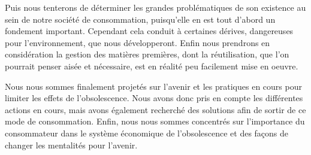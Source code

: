 \smallbreak Puis nous tenterons de déterminer les grandes problématiques de son existence au sein de notre société de consommation, puisqu'elle en est tout d'abord un fondement important. Cependant cela conduit à certaines dérives, dangereuses pour l'environnement, que nous développeront. Enfin nous prendrons en considération la gestion des matières premières, dont la réutilisation, que l'on pourrait penser aisée et nécessaire, est en réalité peu facilement mise en oeuvre.

\smallbreak Nous nous sommes finalement projetés sur l'avenir et les pratiques en cours pour limiter les effets de l'obsolescence. Nous avons donc pris en compte les différentes actions en cours, mais avons également recherché des solutions afin de sortir de ce mode de consommation. Enfin, nous nous sommes concentrés sur l'importance du consommateur dans le système économique de l'obsolescence et des façons de changer les mentalités pour l'avenir.
